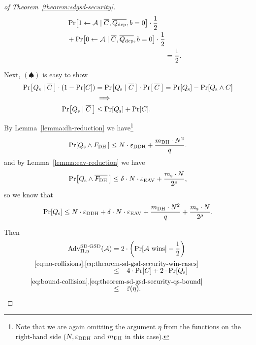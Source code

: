 \begin{proof}[of Theorem~\ref{theorem:sdgsd-security}]
\begin{align*}
\begin{aligned}[t]
			                                                                                                                                   & \pr{1 \from \adv \mid \overline{C}, \overline{\qdep}, b = 0} \cdot \frac{1}{2}   \\
			                                                                                                                                   & + \pr{0 \from \adv \mid \overline{C}, \overline{\qdep}, b = 0} \cdot \frac{1}{2}
		                                                                                                                                  \end{aligned} \\
		                                                  & = \frac{1}{2}.
	\end{align*}

	Next, $(\spadesuit)$ is easy to show
	\begin{align*}
		\pr{\qs \mid \overline{C} \,} \cdot (1 - \pr{C}) & = \pr{\qs \mid \overline{C} \,} \cdot \pr{\, \overline{C} \,} = \pr{\qs} - \pr{\qs \land C} \\
		                                                 & \implies                                                                                    \\
		\pr{\qs \mid \overline{C} \,}                    & \le \pr{\qs} + \pr{C}.
	\end{align*}

	By Lemma~\ref{lemma:dh-reduction} we have\footnote{Note that we are again omitting the argument $\eta$ from the functions on the right-hand side ($N, \varepsilon_\mathrm{DDH}$ and $m_\mathrm{DH}$ in this case).}
	\[
		\pr{\qs \land \fdh \,} \le N \cdot \eddh + \frac{\mdh \cdot N^2}{q}.
	\]
	and by Lemma~\ref{lemma:eav-reduction} we have
	\[
		\pr{\qs \land \overline{\fdh} \,} \le \delta \cdot N \cdot \eeav + \frac{\ms \cdot N}{2^\rho},
	\]
	so we know that
	\begin{equation} \label{eq:theorem-sd-gsd-security-qs-bound}
		\pr{\qs} \le N \cdot \eddh + \delta \cdot N \cdot \eeav + \frac{\mdh \cdot N^2}{q} + \frac{\ms \cdot N}{2^\rho}.
	\end{equation}

	Then
	\begin{align*}
		\advantage{\Pi}{\eta}{SD\text{-}GSD}(\adv) & = 2 \cdot \left(\pr{\wins} - \frac{1}{2}\right)                                                                                            \\
		                                           & \stackrel{\mathclap{\eqref{eq:no-collisions}, \eqref{eq:theorem-sd-gsd-security-win-cases}}}{\le} \;\;\; 4 \cdot \pr{C} + 2 \cdot \pr{\qs} \\
		                                           & \stackrel{\mathclap{\eqref{eq:bound-collision}, \eqref{eq:theorem-sd-gsd-security-qs-bound}}}{\le} \;\;\; \tilde{\epsilon}(\eta).
	\end{align*}
\end{proof}

